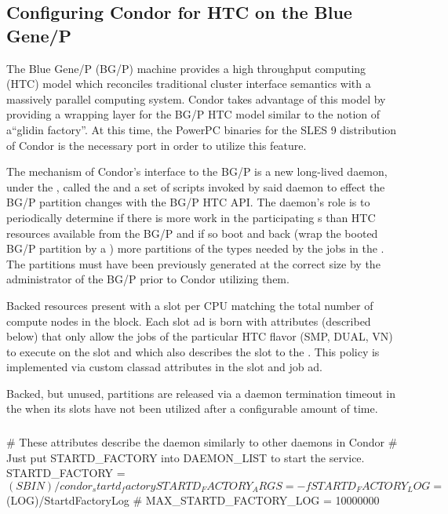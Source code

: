 \subsection{\label{sec:HTCBluegeneP}
	Configuring Condor for HTC on the Blue Gene/P} 

The Blue Gene/P (BG/P) machine provides a high throughput computing
(HTC) model which reconciles traditional cluster interface semantics
with a massively parallel computing system. Condor takes advantage of
this model by providing a wrapping layer for the BG/P HTC model similar
to the notion of a``glidin factory''. At this time, the PowerPC binaries
for the SLES 9 distribution of Condor is the necessary port in order to
utilize this feature.

The mechanism of Condor's interface to the BG/P is a new long-lived
daemon, under the , called the 
and a set of scripts invoked by said daemon to effect the BG/P partition
changes with the BG/P HTC API.  The  daemon's role
is to periodically determine if there is more work in the participating
s than HTC resources available from the BG/P and if so
boot and back (wrap the booted BG/P partition by a )
more partitions of the types needed by the jobs in the .
The partitions must have been previously generated at the correct size
by the administrator of the BG/P prior to Condor utilizing them.

Backed resources present with a slot per CPU matching the total number
of compute nodes in the block. Each slot ad is born with attributes
(described below) that only allow the jobs of the particular HTC flavor
(SMP, DUAL, VN) to execute on the slot and which also describes the slot
to the . This policy is implemented via custom
classad attributes in the slot and job ad.

Backed, but unused, partitions are released via a daemon termination
timeout in the  when its slots have not been utilized after
a configurable amount of time.

\subsubsection{}

# These attributes describe the daemon similarly to other daemons in Condor
# Just put STARTD_FACTORY into DAEMON_LIST to start the service.
STARTD_FACTORY = $(SBIN)/condor_startd_factory
STARTD_FACTORY_ARGS = -f
STARTD_FACTORY_LOG = $(LOG)/StartdFactoryLog
# MAX_STARTD_FACTORY_LOG = 10000000

